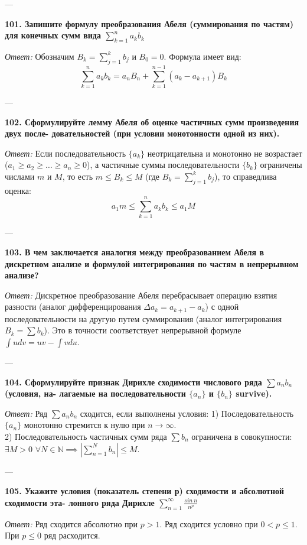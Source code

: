 \documentclass{article}
\begin{document}
---

\textbf{101. Запишите формулу преобразования Абеля (суммирования по частям) для конечных сумм вида $\sum_{k=1}^{n}a_{k}b_{k}$}

\textit{Ответ:} Обозначим $B_k = \sum_{j=1}^k b_j$ и $B_0 = 0$. Формула имеет вид:
$$ \sum_{k=1}^{n} a_k b_k = a_n B_n + \sum_{k=1}^{n-1} (a_k - a_{k+1}) B_k $$

---

\textbf{102. Сформулируйте лемму Абеля об оценке частичных сумм произведения двух после- довательностей (при условии монотонности одной из них).}

\textit{Ответ:} Если последовательность $\{a_k\}$ неотрицательна и монотонно не возрастает ($a_1 \ge a_2 \ge \dots \ge a_n \ge 0$), а частичные суммы последовательности $\{b_k\}$ ограничены числами $m$ и $M$, то есть $m \le B_k \le M$ (где $B_k = \sum_{j=1}^k b_j$), то справедлива оценка:
$$ a_1 m \le \sum_{k=1}^n a_k b_k \le a_1 M $$

---

\textbf{103. В чем заключается аналогия между преобразованием Абеля в дискретном анализе и формулой интегрирования по частям в непрерывном анализе?}

\textit{Ответ:} Дискретное преобразование Абеля перебрасывает операцию взятия разности (аналог дифференцирования $\Delta a_k = a_{k+1} - a_k$) с одной последовательности на другую путем суммирования (аналог интегрирования $B_k = \sum b_k$). Это в точности соответствует непрерывной формуле $\int u dv = uv - \int v du$.

---

\textbf{104. Сформулируйте признак Дирихле сходимости числового ряда $\sum a_{n}b_{n}$ (условия, на- лагаемые на последовательности $\{a_{n}\}$ и $\{b_{n}\}$ survive).}

\textit{Ответ:} Ряд $\sum a_n b_n$ сходится, если выполнены условия:
1) Последовательность $\{a_n\}$ монотонно стремится к нулю при $n \to \infty$. \\
2) Последовательность частичных сумм ряда $\sum b_n$ ограничена в совокупности: $\exists M > 0 \,\, \forall N \in \mathbb{N} \implies \left| \sum_{n=1}^N b_n \right| \le M$.

---

\textbf{105. Укажите условия (показатель степени р) сходимости и абсолютной сходимости эта- лонного ряда Дирихле $\sum_{n=1}^{\infty}\frac{sin~n}{n^{p}}$}

\textit{Ответ:} Ряд сходится абсолютно при $p > 1$. Ряд сходится условно при $0 < p \le 1$. При $p \le 0$ ряд расходится.
\end{document}
